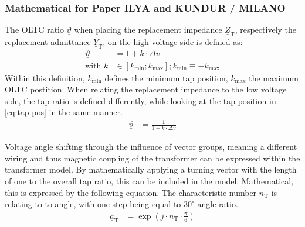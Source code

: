 \subsubsection{Mathematical for Paper ILYA and KUNDUR / MILANO}

The \acs{OLTC} ratio $\underline{\vartheta}$ when placing the replacement impedance $\underline{Z}_\mathrm{T}$, respectively the replacement admittance $\underline{Y}_\mathrm{T}$, on the high voltage side is defined as:
\begin{align}
        \underline{\vartheta} &= 1 + k \cdot \Delta v \label{eq:tap-ratio-hv} \\[6pt]
        \text{with } k &\in [k_\mathrm{min};k_\mathrm{max}]; k_\mathrm{min} \equiv  -k_\mathrm{max} \label{eq:tap-pos}
\end{align}
Within this definition, $k_\mathrm{min}$ defines the minimum tap position, $k_\mathrm{max}$ the maximum \acs{OLTC} postition. When relating the replacement impedance to the low voltage side, the tap ratio is defined differently, while looking at the tap position in \autoref{eq:tap-pos} in the same manner.
\begin{align}
        \underline{\vartheta} &= \frac{1}{1 + k \cdot \Delta v} \label{eq:tap-ratio-lv}
\end{align}

Voltage angle shifting through the influence of vector groups, meaning a different wiring and thus magnetic coupling of the transformer can be expressed within the transformer model. By mathematically applying a turning vector with the length of one to the overall tap ratio, this can be included in the model. Mathematical, this is expressed by the following equation. The characteristic number $n_\mathrm{T}$ is relating to to angle, with one step being equal to $30^\circ$ angle ratio.
\begin{align}
        \underline{a}_\mathrm{T} &= \exp(j \cdot n_\mathrm{T} \cdot \frac{\pi}{6}) \label{eq:vector-group}
\end{align}

